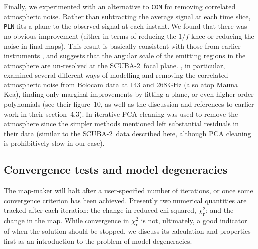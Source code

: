 \documentclass[useAMS,usenatbib,nofootinbib]{mn2e}
\newcommand{\scuba}{SCUBA-2}
\newcommand{\model}[1]{\texttt{#1}}
\begin{document}
Finally, we experimented with an alternative to \model{COM} for
removing correlated atmospheric noise. Rather than subtracting the
average signal at each time slice, \model{PLN} fits a plane to the
observed signal at each instant. We found that there was no obvious
improvement (either in terms of reducing the $1/f$ knee or reducing
the noise in final maps). This result is basically consistent with
those from earlier instruments \citep[e.g., the prediction for \scuba\
based on SCUBA data described in][]{chapin2002}, and suggests that the
angular scale of the emitting regions in the atmosphere are
un-resolved at the \scuba\ focal plane. \citet{sayers2010}, in
particular, examined several different ways of modelling and removing
the correlated atmospheric noise from Bolocam data at 143 and 268\,GHz
(also atop Mauna Kea), finding only marginal improvements by fitting a
plane, or even higher-order polynomials (see their figure~10, as well
as the discussion and references to earlier work in their
section~4.3). In \citet{aguirre2011} iterative PCA cleaning was used
to remove the atmosphere since the simpler methods mentioned left
substantial residuals in their data (similar to the \scuba\ data
described here, although PCA cleaning is prohibitively slow in our
case).

\subsection{Convergence tests and model degeneracies}
\label{sec:converge}

The map-maker will halt after a user-specified number of iterations,
or once some convergence criterion has been achieved. Presently two
numerical quantities are tracked after each iteration: the change in
reduced chi-squared, $\chi^2_\mathrm{r}$; and the change in the
map. While convergence in $\chi^2_\mathrm{r}$ is not, ultimately, a
good indicator of when the solution should be stopped, we discuss its
calculation and properties first as an introduction to the problem of
model degeneracies.
\end{document}
